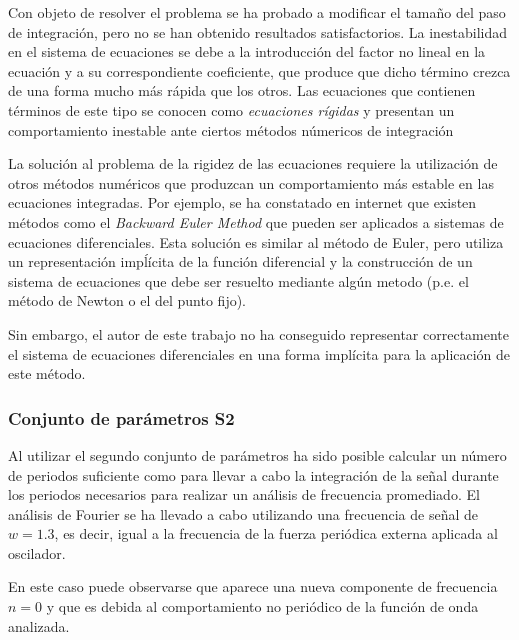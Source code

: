 \documentclass[11pt]{article}
\begin{document}
Con objeto de resolver el problema se ha probado a modificar el tamaño del paso
de integración, pero no se han obtenido resultados satisfactorios. La
inestabilidad en el sistema de ecuaciones se debe a la introducción del factor
no lineal en la ecuación y a su correspondiente coeficiente, que produce que
dicho término crezca de una forma mucho más rápida que los otros. Las
ecuaciones que contienen términos de este tipo se conocen como
\textit{ecuaciones rígidas} y presentan un comportamiento inestable ante ciertos
métodos númericos de integración

La solución al problema de la rigidez de las ecuaciones requiere la utilización
de otros métodos numéricos que produzcan un comportamiento más estable en las
ecuaciones integradas. Por ejemplo, se ha constatado en internet que existen
métodos como el \textit{Backward Euler Method} que pueden ser aplicados a
sistemas de ecuaciones diferenciales. Esta solución es similar al método de
Euler, pero utiliza un representación impĺícita de la función diferencial y la
construcción de un sistema de ecuaciones que debe ser resuelto mediante algún
metodo (p.e. el método de Newton o el del punto fijo). 

Sin embargo, el autor de este trabajo no ha conseguido representar correctamente
el sistema de ecuaciones diferenciales en una forma implícita para la aplicación
de este método.

\subsubsection{Conjunto de parámetros S2}
Al utilizar el segundo conjunto de parámetros ha sido posible calcular un número
de periodos suficiente como para llevar a cabo la integración de la señal
durante los periodos necesarios para realizar un análisis de frecuencia
promediado. El análisis de Fourier se ha llevado a cabo utilizando una
frecuencia de señal de $w=1.3$, es decir, igual a la frecuencia de la fuerza
periódica externa aplicada al oscilador.

En este caso puede observarse que aparece una nueva componente de frecuencia
$n=0$ y que es debida al comportamiento no periódico de la función de onda
analizada.
\end{document}
